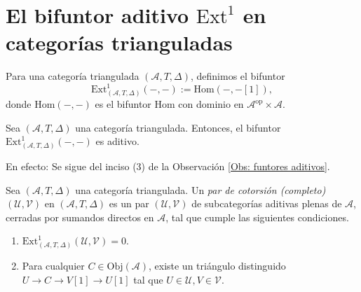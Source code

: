 \documentclass[tesis]{subfiles}
\begin{document}
\section{El bifuntor aditivo $\text{Ext}^1$ en categorías trianguladas} \label{Sec: El bifuntor aditivo Ext1 en categorías trianguladas}

\begin{Def}
    Para una categoría triangulada $(\mathscr{A},T,\Delta)$, definimos el bifuntor
    \[
    \text{Ext}^1_{(\mathscr{A},T,\Delta)}(-,-) := \text{Hom}(-,-[1]),
    \] 
    donde $\text{Hom}(-,-)$ es el bifuntor Hom con dominio en $\mathscr{A}^\text{op}\times\mathscr{A}$.
\end{Def}

\begin{Obs}\label{Obs: Funtor E1}
    Sea $(\mathscr{A},T,\Delta)$ una categoría triangulada. Entonces, el bifuntor $\text{Ext}^1_{(\mathscr{A},T,\Delta)}(-,-)$ es aditivo.

    \vspace{1mm}

    En efecto: Se sigue del inciso (3) de la Observación \ref{Obs: funtores aditivos}.
\end{Obs}

\begin{Def}\cite[Definition 1.1]{Nakaoka}\label{Def: Pares de cotorsión en categorías trianguladas} %
    Sea $(\mathscr{A},T,\Delta)$ una categoría triangulada. Un \emph{par de cotorsión (completo)} $(\mathcal{U},\mathcal{V})$ en $(\mathscr{A},T,\Delta)$ es un par $(\mathcal{U},\mathcal{V})$ de subcategorías aditivas plenas de $\mathscr{A}$, cerradas por sumandos directos en $\mathscr{A}$, tal que cumple las siguientes condiciones.

    \begin{enumerate}[label=(\alph*)]
    
        \item $\text{Ext}^1_{(\mathscr{A},T,\Delta)}(\mathcal{U},\mathcal{V})=0$.
            
        \item Para cualquier $C\in\text{Obj}(\mathscr{A})$, existe un triángulo distinguido $U\to C\to V[1]\to U[1]$ tal que $U\in\mathcal{U}, V\in\mathcal{V}$.
    \end{enumerate}
\end{Def}
\end{document}

